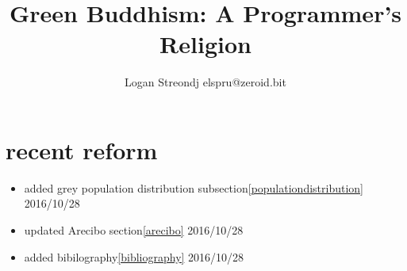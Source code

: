 \documentclass{report}
\title{Green Buddhism: A Programmer's Religion}
\author{Logan Streondj elspru@zeroid.bit}
\begin{document}
\maketitle

\section{recent reform}
\begin{itemize}
  \item added grey population distribution subsection\ref{populationdistribution}
2016/10/28
 \item updated Arecibo section\ref{arecibo} 2016/10/28
 \item added bibilography\ref{bibliography} 2016/10/28
\end{itemize}
\tableofcontents

\printbibliography{}
\label{bibliography}
\end{document}
